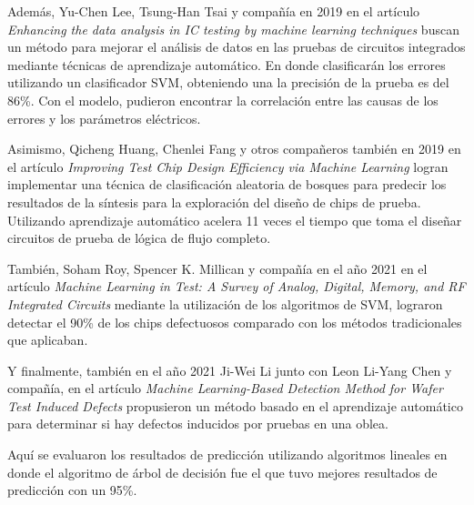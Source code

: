 Además, Yu-Chen Lee, Tsung-Han Tsai y compañía en 2019 en el artículo \textit{Enhancing the data analysis in IC testing by machine learning techniques} buscan un método para mejorar el análisis de datos en las pruebas de circuitos integrados mediante técnicas de aprendizaje automático. En donde clasificarán los errores utilizando un clasificador SVM, obteniendo una la precisión de la prueba es del 86\%. Con el modelo, pudieron encontrar la correlación entre las causas de los errores y los parámetros eléctricos.\par

Asimismo, Qicheng Huang, Chenlei Fang y otros compañeros también en 2019 en el artículo \textit{Improving Test Chip Design Efficiency via Machine Learning} logran implementar una técnica de clasificación aleatoria de bosques para predecir los resultados de la síntesis para la exploración del diseño de chips de prueba. Utilizando aprendizaje automático acelera 11 veces el tiempo que toma el diseñar circuitos de prueba de lógica de flujo completo.\par

También, Soham Roy, Spencer K. Millican  y compañía en el año 2021 en el artículo \textit{Machine Learning in Test: A Survey of Analog, Digital, Memory, and RF Integrated Circuits} mediante la utilización de los algoritmos de SVM, lograron detectar el 90\% de los chips defectuosos comparado con los métodos tradicionales que aplicaban.\par

Y finalmente, también en el año 2021 Ji-Wei Li junto con Leon Li-Yang Chen y compañía, en el artículo \textit{Machine Learning-Based Detection Method for Wafer Test Induced Defects} propusieron un método basado en el aprendizaje automático para determinar si hay defectos inducidos por pruebas en una oblea.\par

Aquí se evaluaron los resultados de predicción utilizando algoritmos lineales en donde el algoritmo de árbol de decisión fue el que tuvo mejores resultados de predicción con un 95\%.\par


